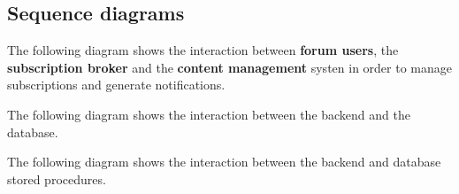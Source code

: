 \documentclass[12pt]{report}
\renewcommand\emph{\textbf}
\begin{document}

                \newpage


                \newpage
                \newpage

            \subsection{Sequence diagrams}

                The following diagram shows the interaction between \emph{forum users}, the \emph{subscription broker} and the \emph{content management} systen in order to manage subscriptions and generate notifications.


                \newpage

                The following diagram shows the interaction between the backend and the database.


                \newpage

                The following diagram shows the interaction between the backend and database stored procedures.

\end{document}
